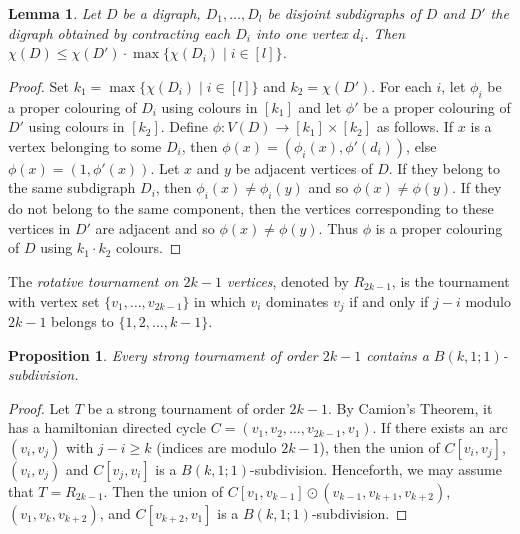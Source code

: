 \documentclass[utf8,10pt]{article}
\theoremstyle{plain}
\newtheorem{lemma}[theorem]{Lemma}
\newtheorem{proposition}[theorem]{Proposition}
\theoremstyle{definition}
\theoremstyle{remark}
\begin{document}
\begin{lemma}\label{lem:contrac}
Let $D$ be a digraph, $D_1, \dots , D_l$ be disjoint subdigraphs of $D$ and $D'$ the digraph obtained by contracting each $D_i$ into
one vertex $d_i$. Then $\chi(D) \leq \chi(D')\cdot \max\{\chi(D_i) \mid i \in [l]\}$.
\end{lemma}

\begin{proof}

Set $k_1 = \max\{\chi(D_i) \mid i \in [l]\}$ and $k_2 = \chi(D')$. For each $i$, let $\phi_i$ be a proper colouring of $D_i$ using colours in $[k_1]$ and let
$\phi'$ be a proper colouring of $D'$ using colours in $[k_2]$. 
Define $\phi : V(D) \rightarrow [k_1] \times [k_2]$ as follows. If $x$ is a vertex belonging to some $D_i$, then $\phi(x) = (\phi_i(x), \phi'(d_i))$, else $\phi(x) =(1,\phi'(x))$. 
Let $x$ and $y$ be adjacent vertices of $D$. If they belong to the same subdigraph $D_i$, then $\phi_i(x) \not = \phi_i(y)$ and so $\phi(x) \not = \phi(y)$. If they do not belong
to the same component, then the vertices corresponding to these vertices in $D'$ are adjacent and so $\phi(x) \not = \phi(y)$. 
Thus $\phi$ is a proper colouring of $D$ using $k_1\cdot k_2$ colours. 
\end{proof}



The {\it rotative tournament on $2k-1$ vertices}, denoted by $R_{2k-1}$, is the tournament with vertex set $\{v_1, \dots , v_{2k-1}\}$ in which $v_i$ dominates $v_j$ if and only if $j-i$ modulo $2k-1$ belongs to $\{1,2, \dots ,k-1\}$.


\begin{proposition}\label{prop:tournoi}
Every strong tournament of order $2k-1$ contains a $B(k,1;1)$-subdivision.
\end{proposition}
\begin{proof}
Let $T$ be a strong tournament of order $2k-1$. By Camion's Theorem, it has a hamiltonian directed cycle $C=(v_1,v_2, \dots ,v_{2k-1},v_1)$.
If there exists an arc $(v_i,v_j)$ with $j-i\geq k$  (indices are modulo $2k-1$), then the union of  $C[v_i,v_j]$, $(v_i,v_j)$ and $C[v_j,v_i]$ is a $B(k,1;1)$-subdivision.
Henceforth, we may assume that $T=R_{2k-1}$.
Then the union of $C[v_1, v_{k-1}] \odot (v_{k-1}, v_{k+1}, v_{k+2})$,  $(v_1, v_{k}, v_{k+2})$, and $C[v_{k+2}, v_1]$ is a $B(k,1;1)$-subdivision.
\end{proof}
\end{document}

